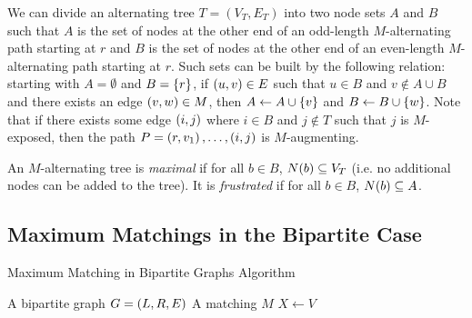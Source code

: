 We can divide an alternating tree $T = (V_T, E_T)$ into two node sets $A$ and $B$ such that $A$ is the set of nodes 
at the other end of an odd-length $M$-alternating path starting at $r$ and $B$ is the set of nodes at the other end 
of an even-length $M$-alternating path starting at $r$. Such sets can be built by the following relation: 
starting with $A = \emptyset$ and $B = \lrc{r}$, if $\lrp{u, v} \in E$ such that $u \in B$ and $v \notin A \cup B$ and there 
exists an edge $\lrp{v, w} \in M$, then $A \gets A \cup \lrc{v}$ and $B \gets B \cup \lrc{w}$. Note that if there exists some 
edge $\lrp{i, j}$ where $i \in B$ and $j \notin T$ such that $j$ is $M$-exposed, then the path $P = \lrp{r, v_1}, \ldots, \lrp{i, j}$
is $M$-augmenting. 

\begin{definition}
    An $M$-alternating tree is \emph{maximal} if for all $b \in B$, $\f[N]{b} \sse V_T$ (i.e.\! no additional nodes can be added to the tree).
    It is \emph{frustrated} if for all $b \in B$, $\f[N]{b} \sse A$.
    \label{def:maximal_alternating_tree}
\end{definition} 

\subsection{Maximum Matchings in the Bipartite Case}

\begin{algorithm}[!h]
    \caption{Maximum Matching in Bipartite Graphs Algorithm} \label{alg:max_match_bipartite}
    \begin{algorithmic}[1]
        \Algin A bipartite graph $G = \lrp{L, R, E}$
        \Algout A matching $M$ 
        \State $X \gets V$ 
    \end{algorithmic}
\end{algorithm}